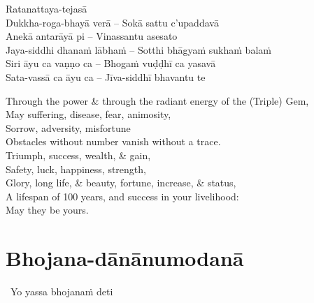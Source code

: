 \vspace{-0.5em}

\begin{pali-hang}
  Ratanattaya-tejasā\\
  Dukkha-roga-bhayā verā – Sokā sattu c'upaddavā\\
  Anekā antarāyā pi – Vinassantu asesato\\
  Jaya-siddhi dhanaṁ lābhaṁ – Sotthi bhāgyaṁ sukhaṁ balaṁ\\
  Siri āyu ca vaṇṇo ca – Bhogaṁ vuḍḍhī ca yasavā\\
  Sata-vassā ca āyu ca – Jīva-siddhī bhavantu te
\end{pali-hang}

\begin{english-verses}
  Through the power \& through the radiant energy of the (Triple) Gem,\\
  May suffering, disease, fear, animosity,\\
  Sorrow, adversity, misfortune\\
  Obstacles without number vanish without a trace.\\
  Triumph, success, wealth, \& gain,\\
  Safety, luck, happiness, strength,\\
  Glory, long life, \& beauty, fortune, increase, \& status,\\
  A lifespan of 100 years, and success in your livelihood:\\
  May they be yours.
\end{english-verses}

\suttaRef{[Thai]}

\section{Bhojana-dānānumodanā}
\label{bhojana-dananumodana}


\begin{leader-only}
  \anglebracketleft\ \hspace{-0.5mm}Yo yassa bhojanaṁ deti \hspace{-0.5mm}\anglebracketright\
\end{leader-only}

\vspace{-0.99em}

